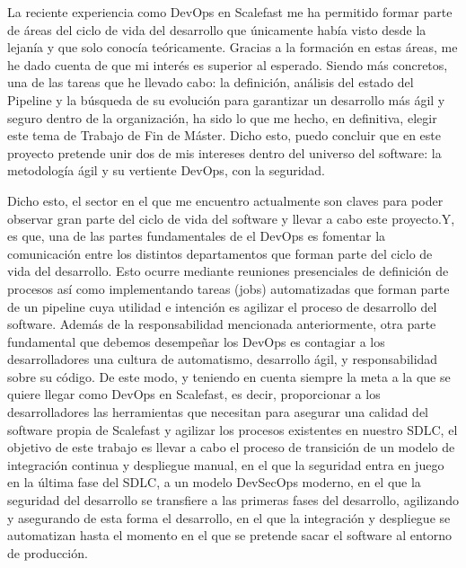\documentclass[12pt]{report} %
\begin{document}
La reciente experiencia como DevOps en Scalefast me ha permitido formar parte de
áreas del ciclo de vida del desarrollo que únicamente había visto desde la
lejanía y que solo conocía teóricamente.  Gracias a la formación en  estas
áreas, me he dado cuenta de que mi interés es superior al esperado. Siendo más
concretos, una de las tareas que he llevado cabo: la definición, análisis del
estado del Pipeline y la búsqueda de su evolución para garantizar un desarrollo
más ágil y seguro dentro de la organización, ha sido lo que me hecho, en
definitiva, elegir este tema de Trabajo de Fin de Máster. Dicho esto, puedo
concluir que en este proyecto pretende unir dos de mis intereses dentro del
universo del software: la metodología ágil y su vertiente DevOps, con la
seguridad.

Dicho esto, el sector en el que me encuentro actualmente son claves para poder
observar gran parte del ciclo de vida del software y llevar a cabo este
proyecto.Y, es que, una de las partes fundamentales de el DevOps es fomentar la
comunicación entre los distintos departamentos que forman parte del ciclo de
vida del desarrollo.  Esto ocurre mediante reuniones presenciales de definición
de procesos así como implementando tareas (jobs) automatizadas que forman parte
de un pipeline cuya utilidad e intención es agilizar el proceso de desarrollo
del software.  Además de la responsabilidad mencionada anteriormente, otra parte
fundamental que debemos desempeñar los DevOps es contagiar a los desarrolladores
una cultura de automatismo, desarrollo ágil, y responsabilidad sobre su código.
De este modo, y teniendo en cuenta siempre la meta a la que se quiere llegar
como DevOps en Scalefast, es decir, proporcionar a los desarrolladores las
herramientas que necesitan para asegurar una calidad del software propia de
Scalefast y agilizar los procesos existentes en nuestro \gls{SDLC}, el objetivo
de este trabajo es llevar a cabo el proceso de transición de un modelo de
integración continua y despliegue manual, en el que la seguridad entra en juego
en la última fase del \gls{SDLC}, a un modelo \gls{DevSecOps} moderno, en el que
la seguridad del desarrollo se transfiere a las primeras fases del desarrollo,
agilizando y asegurando de esta forma el desarrollo, en el que la integración y
despliegue se automatizan hasta el momento en el que se pretende sacar el
software al entorno de producción.
\end{document}
